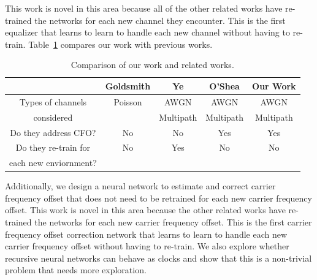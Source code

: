 This work is novel in this area because all of the other related works have re-trained the networks for each new channel they encounter.  This is the first equalizer that learns to learn to handle each new channel without having to re-train. Table~\ref{tab:table1} compares our work with previous works.

\setlength{\tabcolsep}{4pt}
\begin{table}[h!]
  \begin{center}
    \caption{Comparison of our work and related works.}
    \label{tab:table1}
    \begin{tabular}{c|c|c|c|c} %
       & {Goldsmith \cite{farsad2018}} & {Ye \cite{ye2018}} & {O'Shea \cite{osheaatt}} & {Our Work}\\
      \hline
      Types of channels & Poisson & AWGN & AWGN &AWGN \\
           considered &  & Multipath & Multipath & Multipath\\
           \hline
      Do they address CFO? & No & No & Yes & Yes \\
      \hline
      Do they re-train for & No & Yes & No & No\\
      each new enviornment? &  &  &  &\\
    \end{tabular}
  \end{center}
\end{table}

Additionally, we design a neural network to estimate and correct carrier frequency offset that does not need to be retrained for each new carrier frequency offset.
This work is novel in this area because the other related works have re-trained the networks for each new carrier frequency offset.  This is the first carrier frequency offset correction network that learns to learn to handle each new carrier frequency offset without having to re-train.
We also explore whether recursive neural networks can behave as clocks and show that this is a non-trivial problem that needs more exploration.
